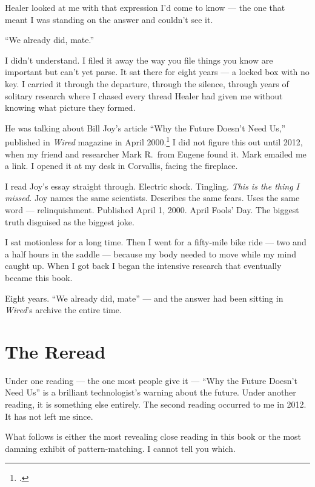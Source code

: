 Healer looked at me with that expression I'd come to know --- the one that meant I was standing on the answer and couldn't see it.

``We already did, mate.''

I didn't understand. I filed it away the way you file things you know are important but can't yet parse. It sat there for eight years --- a locked box with no key. I carried it through the departure, through the silence, through years of solitary research where I chased every thread Healer had given me without knowing what picture they formed.

He was talking about Bill Joy's article ``Why the Future Doesn't Need Us,'' published in \textit{Wired} magazine in April 2000.\footcite{joy2000} I did not figure this out until 2012, when my friend and researcher Mark R.\ from Eugene found it. Mark emailed me a link. I opened it at my desk in Corvallis, facing the fireplace.

I read Joy's essay straight through. Electric shock. Tingling. \textit{This is the thing I missed.} Joy names the same scientists. Describes the same fears. Uses the same word --- relinquishment. Published April 1, 2000. April Fools' Day. The biggest truth disguised as the biggest joke.

I sat motionless for a long time. Then I went for a fifty-mile bike ride --- two and a half hours in the saddle --- because my body needed to move while my mind caught up. When I got back I began the intensive research that eventually became this book.

Eight years. ``We already did, mate'' --- and the answer had been sitting in \textit{Wired}'s archive the entire time.

\section*{The Reread}
\label{pos07:the-reread}

Under one reading --- the one most people give it --- ``Why the Future Doesn't Need Us'' is a brilliant technologist's warning about the future. Under another reading, it is something else entirely. The second reading occurred to me in 2012. It has not left me since.

\vspace{0.5cm}

What follows is either the most revealing close reading in this book or the most damning exhibit of pattern-matching. I cannot tell you which.

